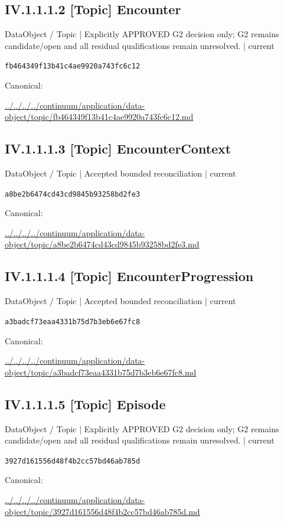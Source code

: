 \documentclass[10pt,a4paper]{article}
\begin{document}
\subsection*{IV.1.1.1.2 [Topic] Encounter}
{\small DataObject / Topic | Explicitly APPROVED G2 decision only; G2 remains candidate/open and all residual qualifications remain unresolved. | current}\par
\texttt{fb464349f13b41c4ae9920a743fc6c12}\par
Canonical: \par
{\footnotesize\url{../../../../continuum/application/data-object/topic/fb464349f13b41c4ae9920a743fc6c12.md}}\par
\subsection*{IV.1.1.1.3 [Topic] EncounterContext}
{\small DataObject / Topic | Accepted bounded reconciliation | current}\par
\texttt{a8be2b6474cd43cd9845b93258bd2fe3}\par
Canonical: \par
{\footnotesize\url{../../../../continuum/application/data-object/topic/a8be2b6474cd43cd9845b93258bd2fe3.md}}\par
\subsection*{IV.1.1.1.4 [Topic] EncounterProgression}
{\small DataObject / Topic | Accepted bounded reconciliation | current}\par
\texttt{a3badcf73eaa4331b75d7b3eb6e67fc8}\par
Canonical: \par
{\footnotesize\url{../../../../continuum/application/data-object/topic/a3badcf73eaa4331b75d7b3eb6e67fc8.md}}\par
\subsection*{IV.1.1.1.5 [Topic] Episode}
{\small DataObject / Topic | Explicitly APPROVED G2 decision only; G2 remains candidate/open and all residual qualifications remain unresolved. | current}\par
\texttt{3927d161556d48f4b2cc57bd46ab785d}\par
Canonical: \par
{\footnotesize\url{../../../../continuum/application/data-object/topic/3927d161556d48f4b2cc57bd46ab785d.md}}\par
\end{document}
